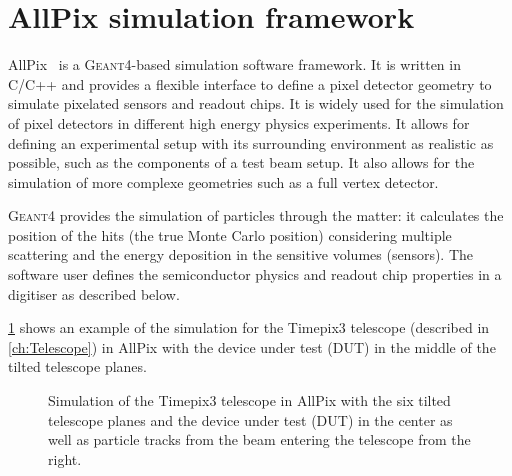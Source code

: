 \section{AllPix simulation framework}
\label{sec:AllPix}

AllPix~\cite{Benoit:1474878,allpix,allpixTwiki} is a
\textsc{Geant4}-based simulation software framework. It is written in
C/C++ and provides a flexible interface to define a pixel detector
geometry to simulate pixelated sensors and readout chips. It is widely
used for the simulation of pixel detectors in different high energy
physics experiments. It allows for defining an experimental setup with
its surrounding environment as realistic as possible, such as the
components of a test beam setup. It also allows for the simulation of
more complexe geometries such as a full vertex detector.

\textsc{Geant4} provides the simulation of particles through the
matter: it calculates the position of the hits (the true Monte Carlo
position) considering multiple scattering and the energy deposition in
the sensitive volumes (sensors). The software user defines the
semiconductor physics and readout chip properties in a digitiser as
described below.

\cref{fig:TPX3TelescopeAllpix} shows an example of the simulation for
the Timepix3 telescope (described in \cref{ch:Telescope}) in AllPix
with the device under test (DUT) in the middle of the tilted telescope
planes.

\begin{figure}[htbp]
  \centering
  \caption{Simulation of the Timepix3 telescope in AllPix with the six
    tilted telescope planes and the device under test (DUT) in the
    center as well as particle tracks from the beam entering the
    telescope from the right.}
  \label{fig:TPX3TelescopeAllpix}
\end{figure}

